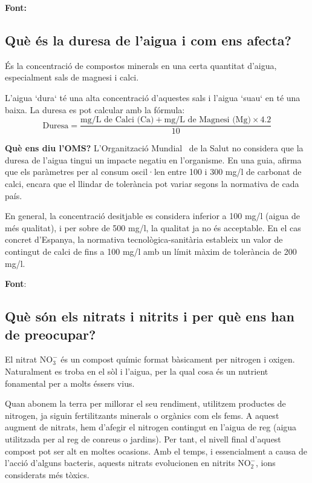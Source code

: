 \textbf{Font:} \cite{PH}

\subsection{Què és la duresa de l’aigua i com ens afecta?} \label{subsec:duresa}
És la concentració de compostos minerals en una certa quantitat d'aigua, especialment sals de magnesi i calci.

L'aigua `dura` té una alta concentració d'aquestes sals i l'aigua `suau` en té una baixa. La duresa es pot calcular amb la fórmula:
\[
\text{Duresa} = \frac{\text{mg/L de Calci (Ca)} + \text{mg/L de Magnesi (Mg)} \times 4.2}{10}
\]


\textbf{Què ens diu l'OMS?} L'Organització Mundial~\cite{OrgaMS} de la Salut no considera que la duresa de l'aigua tingui un impacte negatiu en l'organisme. En una guia, afirma que els paràmetres per al consum oscil·len entre 100 i 300 mg/l de carbonat de calci, encara que el llindar de tolerància pot variar segons la normativa de cada país.

En general, la concentració desitjable es considera inferior a 100 mg/l (aigua de més qualitat), i per sobre de 500 mg/l, la qualitat ja no és acceptable. En el cas concret d'Espanya, la normativa tecnològica-sanitària estableix un valor de contingut de calci de fins a 100 mg/l amb un límit màxim de tolerància de 200 mg/l.

\textbf{Font}: \cite{Fasca}

\subsection{Què són els nitrats i nitrits i per què ens han de preocupar?} \label{subsec:nitratsnitrits}
El nitrat \(\mathrm{NO_3^-}\) és un compost químic format bàsicament per nitrogen i oxigen. Naturalment es troba en el sòl i l'aigua, per la qual cosa és un nutrient fonamental per a molts éssers vius.

Quan abonem la terra per millorar el seu rendiment, utilitzem productes de nitrogen, ja siguin fertilitzants minerals o orgànics com els fems. A aquest augment de nitrats, hem d'afegir el nitrogen contingut en l'aigua de reg (aigua utilitzada per al reg de conreus o jardins). Per tant, el nivell final d'aquest compost pot ser alt en moltes ocasions. Amb el temps, i essencialment a causa de l'acció d'alguns bacteris, aquests nitrats evolucionen en nitrits \(\mathrm{NO_2^-}\), ions considerats més tòxics.

